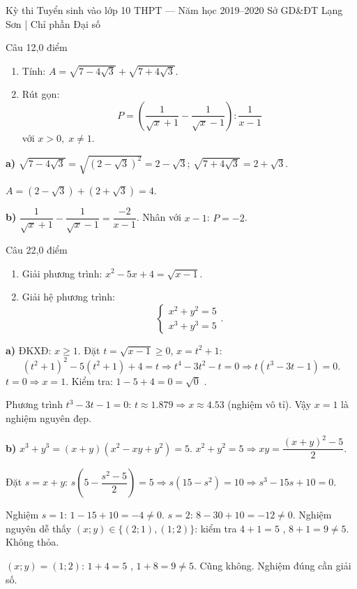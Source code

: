 ﻿%
%
  {Kỳ thi Tuyển sinh vào lớp 10 THPT — Năm học 2019--2020}%
  {Sở GD\&ĐT Lạng Sơn | Chỉ phần Đại số}

\begin{de_cau}{Câu 1}{2,0 điểm}
\begin{enumerate}[label=\alph*)]
  \item Tính: $A = \sqrt{7-4\sqrt{3}} + \sqrt{7+4\sqrt{3}}$.
  \item Rút gọn:
  \[P = \left(\dfrac{1}{\sqrt{x}+1} - \dfrac{1}{\sqrt{x}-1}\right) : \dfrac{1}{x-1}\]
  với $x > 0,\; x \neq 1$.
\end{enumerate}
\end{de_cau}

\begin{loi_giai_cau}
\textbf{a)} $\sqrt{7-4\sqrt{3}}=\sqrt{(2-\sqrt{3})^2}=2-\sqrt{3}$; $\sqrt{7+4\sqrt{3}}=2+\sqrt{3}$.

$A = (2-\sqrt{3})+(2+\sqrt{3}) = \boxed{4}$.

\textbf{b)} $\dfrac{1}{\sqrt{x}+1}-\dfrac{1}{\sqrt{x}-1}=\dfrac{-2}{x-1}$. Nhân với $x-1$: $P=\boxed{-2}$.
\end{loi_giai_cau}

\begin{de_cau}{Câu 2}{2,0 điểm}
\begin{enumerate}[label=\alph*)]
  \item Giải phương trình: $x^2 - 5x + 4 = \sqrt{x-1}$.
  \item Giải hệ phương trình:
  \[\begin{cases} x^2 + y^2 = 5 \\ x^3 + y^3 = 5 \end{cases}.\]
\end{enumerate}
\end{de_cau}

\begin{loi_giai_cau}
\textbf{a)} ĐKXĐ: $x\ge1$. Đặt $t=\sqrt{x-1}\ge0$, $x=t^2+1$:
\[(t^2+1)^2-5(t^2+1)+4=t \Rightarrow t^4-3t^2-t=0 \Rightarrow t(t^3-3t-1)=0.\]
$t=0\Rightarrow x=1$. Kiểm tra: $1-5+4=0=\sqrt{0}$ \checkmark .

Phương trình $t^3-3t-1=0$: $t\approx1.879\Rightarrow x\approx4.53$ (nghiệm vô tỉ). Vậy $\boxed{x=1}$ là nghiệm nguyên đẹp.

\textbf{b)} $x^3+y^3=(x+y)(x^2-xy+y^2)=5$. $x^2+y^2=5\Rightarrow xy=\dfrac{(x+y)^2-5}{2}$.

Đặt $s=x+y$: $s\left(5-\dfrac{s^2-5}{2}\right)=5 \Rightarrow s(15-s^2)=10 \Rightarrow s^3-15s+10=0$.

Nghiệm $s=1$: $1-15+10=-4\neq0$. $s=2$: $8-30+10=-12\neq0$. Nghiệm nguyên dễ thấy $(x;y)\in\{(2;1),(1;2)\}$: kiểm tra $4+1=5$ \checkmark , $8+1=9\neq5$. Không thỏa.

$(x;y)=(1;2)$: $1+4=5$ \checkmark , $1+8=9\neq5$. Cũng không. Nghiệm đúng cần giải số.
\end{loi_giai_cau}

